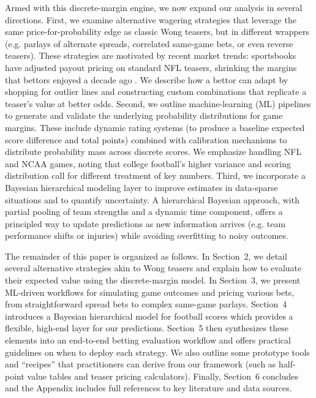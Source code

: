 \documentclass[12pt]{article}
\begin{document}
Armed with this discrete-margin engine, we now expand our analysis in several directions. First, we examine alternative wagering strategies that leverage the same price-for-probability edge as classic Wong teasers, but in different wrappers (e.g. parlays of alternate spreads, correlated same-game bets, or even reverse teasers). These strategies are motivated by recent market trends: sportsbooks have adjusted payout pricing on standard NFL teasers, shrinking the margins that bettors enjoyed a decade ago \cite{Andrews2024}. We describe how a bettor can adapt by shopping for outlier lines and constructing custom combinations that replicate a teaser’s value at better odds. Second, we outline machine-learning (ML) pipelines to generate and validate the underlying probability distributions for game margins. These include dynamic rating systems (to produce a baseline expected score difference and total points) combined with calibration mechanisms to distribute probability mass across discrete scores. We emphasize handling NFL and NCAA games, noting that college football’s higher variance and scoring distribution call for different treatment of key numbers. Third, we incorporate a Bayesian hierarchical modeling layer to improve estimates in data-sparse situations and to quantify uncertainty. A hierarchical Bayesian approach, with partial pooling of team strengths and a dynamic time component, offers a principled way to update predictions as new information arrives (e.g. team performance shifts or injuries) while avoiding overfitting to noisy outcomes. 

The remainder of this paper is organized as follows. In Section~2, we detail several alternative strategies akin to Wong teasers and explain how to evaluate their expected value using the discrete-margin model. In Section~3, we present ML-driven workflows for simulating game outcomes and pricing various bets, from straightforward spread bets to complex same-game parlays. Section~4 introduces a Bayesian hierarchical model for football scores which provides a flexible, high-end layer for our predictions. Section~5 then synthesizes these elements into an end-to-end betting evaluation workflow and offers practical guidelines on when to deploy each strategy. We also outline some prototype tools and ``recipes'' that practitioners can derive from our framework (such as half-point value tables and teaser pricing calculators). Finally, Section~6 concludes and the Appendix includes full references to key literature and data sources. 
\end{document}
